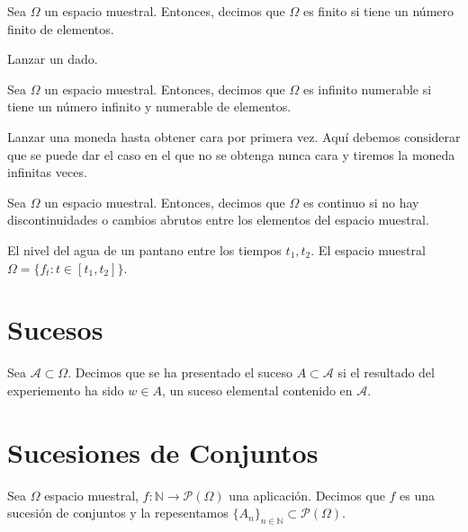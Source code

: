 \begin{defn}
  Sea $\Omega$ un espacio muestral. Entonces, decimos que $\Omega$ es finito si tiene un número finito de elementos.
\end{defn}

\begin{ejm}
  Lanzar un dado.
\end{ejm}

\begin{defn}
  Sea $\Omega$ un espacio muestral. Entonces, decimos que $\Omega$ es infinito numerable si tiene un número infinito y numerable de elementos.
\end{defn}

\begin{ejm}
  Lanzar una moneda hasta obtener cara por primera vez. Aquí debemos considerar que se puede dar el caso en el que no se obtenga nunca cara y tiremos la moneda infinitas veces.
\end{ejm}

\begin{defn}
  Sea $\Omega$ un espacio muestral. Entonces, decimos que $\Omega$ es continuo si no hay discontinuidades o cambios abrutos entre los elementos del espacio muestral.
\end{defn}

\begin{ejm}
  El nivel del agua de un pantano entre los tiempos $t_{1}, t_{2}$. El espacio muestral $\Omega = \{  f_{t} : t \in [t_{1}, t_{2}] \}$.
\end{ejm}

\section{Sucesos}

\begin{note}
  Sea $\mathcal{A} \subset \Omega$. Decimos que se ha presentado el suceso $A \subset \mathcal{A}$ si el resultado del experiemento ha sido $w \in A$, un suceso elemental contenido en $\mathcal{A}$.
\end{note}

\section{Sucesiones de Conjuntos}

\begin{defn}
  Sea $\Omega$ espacio muestral, $f: \mathbb{N} \to \mathcal{P}(\Omega)$ una aplicación. Decimos que $f$ es una sucesión de conjuntos y la repesentamos $\{ A_{n} \}_{n \in \mathbb{N}} \subset \mathcal{P}(\Omega)$.
\end{defn}

